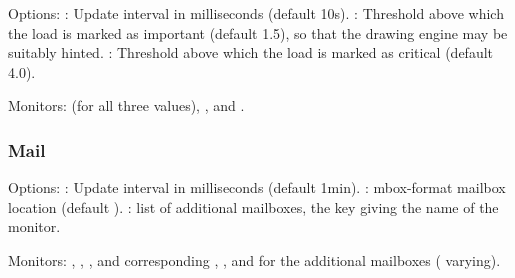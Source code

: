 Options: : Update interval in milliseconds
(default 10s). : Threshold above which 
the load is marked as important (default 1.5), so that the 
drawing engine may be suitably hinted. : 
Threshold above which  the load is marked as critical (default 4.0).


Monitors:  (for all three values), 
,  and .


\subsubsection{Mail}

Options: : Update interval in milliseconds
(default 1min). : mbox-format mailbox location
(default ). 
: list of additional mailboxes, the key giving the 
name of the monitor.

Monitors: , ,
, and corresponding
, , and 
for the additional mailboxes (\code{*} varying).
